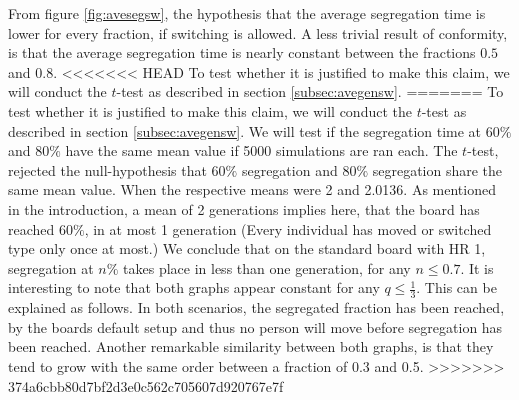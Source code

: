 From figure \ref{fig:avesegsw}, the hypothesis that the average segregation time is lower for every fraction, if switching is allowed. 
A less trivial result of conformity, is that the average segregation time is nearly constant between the fractions \(0.5\) and \(0.8\). 
<<<<<<< HEAD
To test whether it is justified to make this claim, we will conduct the \(t\)-test as described in section \ref{subsec:avegensw}. 
=======
To test whether it is justified to make this claim, we will conduct the \(t\)-test as described in section \ref{subsec:avegensw}. We will test if the segregation time at \(60\%\) and \(80\%\) have the same mean value if 5000 simulations are ran each. 
The \(t\)-test, rejected the null-hypothesis that \(60\%\) segregation and \(80\%\) segregation share the same mean value. When the respective means were 2 and 2.0136. As mentioned in the introduction, a mean of 2 generations implies here, that the board has reached \(60\%\), in at most 1 generation (Every individual has moved or switched type only once at most.)
We conclude that on the standard board with HR 1, segregation at \(n\%\) takes place in less than one generation, for any \(n\leq 0.7\). 
It is interesting to note that both graphs appear constant for any \(q\leq \frac{1}{3}\). 
This can be explained as follows. In both scenarios, the segregated fraction has been reached, by the boards default setup and thus no person will move before segregation has been reached.
Another remarkable similarity between both graphs, is that they tend to grow with the same order between a fraction of 0.3 and 0.5.
>>>>>>> 374a6cbb80d7bf2d3e0c562c705607d920767e7f
